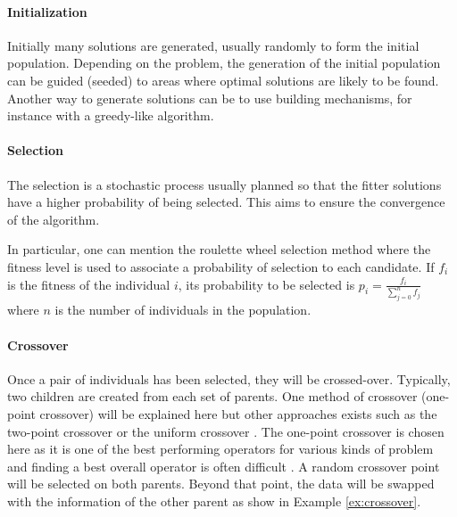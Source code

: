 \paragraph{Initialization}
Initially many solutions are generated, usually randomly to form the initial population. Depending on the problem, the generation of the initial population can be guided (seeded) to areas where optimal solutions are likely to be found. Another way to generate solutions can be to use building mechanisms, for instance with a greedy-like algorithm.

\paragraph{Selection}
The selection is a stochastic process usually planned so that the fitter solutions have a higher probability of being selected. This aims to ensure the convergence of the algorithm.

In particular, one can mention the roulette wheel selection method where the fitness level is used to associate a probability of selection to each candidate. If $f_i$ is the fitness of the individual $i$, its probability to be selected is $p_i = \frac{f_i}{\sum_{j=0}^{n}f_j}$ where $n$ is the number of individuals in the population.

\paragraph{Crossover}
Once a pair of individuals has been selected, they will be crossed-over. Typically, two children are created from each set of parents. One method of crossover (one-point crossover) will be explained here but other approaches exists such as the two-point crossover or the uniform crossover \cite{vekaria1998}. The one-point crossover is chosen here as it is one of the best performing operators for various kinds of problem and finding a best overall operator is often difficult \cite{picek2012}. A random crossover point will be selected on both parents. Beyond that point, the data will be swapped with the information of the other parent as show in Example \ref{ex:crossover}.

